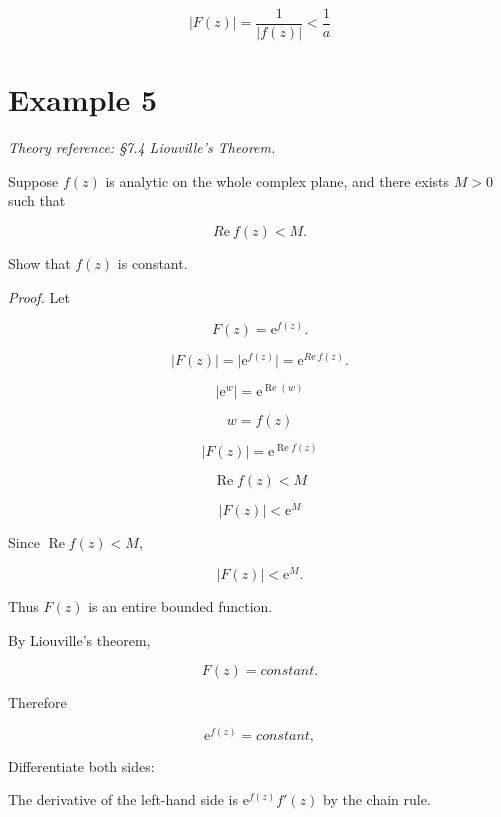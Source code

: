 \documentclass[11pt,a4paper]{article}
\theoremstyle{definition}
\theoremstyle{plain}
\begin{document}
\[
\vert{}F(z)\vert{} = \frac{1}{\vert{}f(z)\vert{}} < \frac{1}{a}
\]

\section*{Example 5}

\textit{Theory reference: §7.4 Liouville's Theorem.}

Suppose $f(z)$ is analytic on the whole complex plane, and there exists $M > 0$ such that

\begin{equation}
R\mathrm{e}\ f(z) < M.
\end{equation}

Show that $f(z)$ is constant.

\textit{Proof.} Let

\begin{equation}
F(z) = \mathrm{e}^{f(z)}.
\end{equation}

\[
\vert{}F(z)\vert{} = \vert{}\mathrm{e}^{f(z)}\vert{} = \mathrm{e}^{R\mathrm{e}\ f(z)}.
\]

\[
\vert{}\mathrm{e}^{w}\vert{} = \mathrm{e}^{\operatorname{Re}(w)}
\]

\[
w = f(z)
\]

\[
\vert{}F(z)\vert{} = \mathrm{e}^{\operatorname{Re}f(z)}
\]

\[
\operatorname{Re}f(z) < M
\]

\[
\vert{}F(z)\vert{} < \mathrm{e}^{M}
\]

Since $\operatorname{Re}f(z) < M$,

\begin{equation}
\vert{}F(z)\vert{} < \mathrm{e}^{M}.
\end{equation}

Thus $F(z)$ is an entire bounded function.

By Liouville’s theorem,

\begin{equation}
F(z) = constant.
\end{equation}

Therefore

\begin{equation}
\mathrm{e}^{f(z)} = constant,
\end{equation}

Differentiate both sides:

The derivative of the left-hand side is $\mathrm{e}^{f(z)}f'(z)$ by the chain rule.
\end{document}
